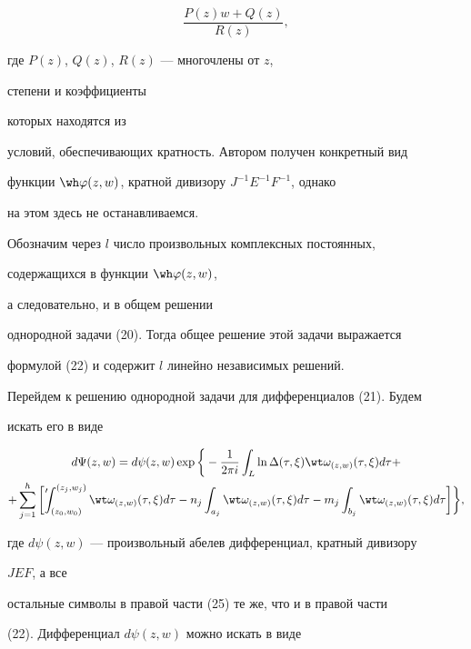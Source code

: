 $$ 


\frac{P(z)w+Q(z)}{R(z)},


$$ 


где $P(z)$, $Q(z)$, $R(z)$ --- многочлены от $z$, 


степени и коэффициенты 


которых находятся из 


условий, обеспечивающих кратность. Автором получен конкретный вид 


функции $\wh\varphi(z,w)$, кратной дивизору $J^{-1}E^{-1}F^{-1}$, однако 


на этом здесь не останавливаемся. 


Обозначим через $l$ число произвольных комплексных постоянных, 


содержащихся в функции $\wh\varphi(z,w)$, 


а следовательно, и в общем решении 


однородной задачи (20). Тогда общее решение этой задачи выражается 


формулой (22) и содержит $l$ линейно независимых решений. 


 


Перейдем к решению однородной задачи для дифференциалов (21). Будем 


искать его в виде 


\begin{multline} 


d\Psi(z,w)=d\psi(z,w)\exp\bigg\{-\frac{1}{2\pi i} 


\int_L\ln\Delta(\tau,\xi)\wt\omega_{(z,w)}(\tau,\xi)d\tau+ \\ 


% 


+ \sum^h_{j=1}\bigg[


\fuckprime\int^{(z_j,w_j)}_{(z_0,w_0)}\wt\omega_{(z,w)} 


(\tau,\xi)d\tau 


-n_j\int_{a_j}\wt\omega_{(z,w)}(\tau,\xi)d\tau- 


m_j\int_{b_j}\wt\omega_{(z,w)}(\tau,\xi)d\tau\bigg]\bigg\},


\end{multline} 


где $d\psi(z,w)$ --- произвольный абелев дифференциал, кратный дивизору 


$JEF$, а все 


остальные символы в правой части (25) те же, что и в правой части 


(22). Дифференциал $d\psi(z,w)$ можно искать в виде 


